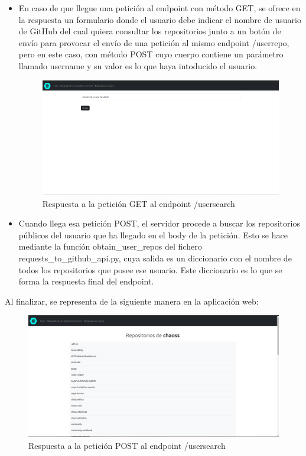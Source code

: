 \documentclass[a4paper, 12pt]{book}
\begin{document}
\begin{itemize}
  \item En caso de que llegue una petición al endpoint con método GET, se ofrece en la respuesta un formulario donde el usuario debe indicar el nombre de usuario de GitHub del cual quiera consultar los repositorios junto a un botón de envío para provocar el envío de una petición al mismo endpoint /userrepo, pero en este caso, con método POST cuyo cuerpo contiene un parámetro llamado username y su valor es lo que haya intoducido el usuario.
    \begin{figure}[H]
      \centering
      \includegraphics[width=1\textwidth]{img/usersearchget.png}
      \caption{Respuesta a la petición GET al endpoint /usersearch}
      \label{figura:usersearch}
    \end{figure}
  \item Cuando llega esa petición POST, el servidor procede a buscar los repositorios públicos del usuario que ha llegado en el body de la petición. Esto se hace mediante la función obtain\_user\_repos del fichero requests\_to\_github\_api.py, cuya salida es un diccionario con el nombre de todos los repositorios que posee ese usuario. Este diccionario es lo que se forma la respuesta final del endpoint.
\end{itemize}

Al finalizar, se representa de la siguiente manera en la aplicación web:


\begin{figure}[H]
  \centering
  \includegraphics[width=1\textwidth]{img/usersearchpost.png}
  \caption{Respuesta a la petición POST al endpoint /usersearch}
  \label{figura:resultusersearch}
\end{figure}
\end{document}
